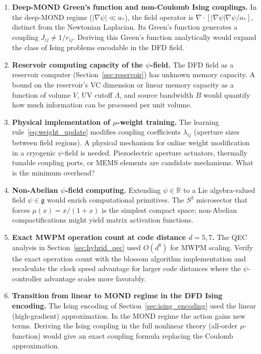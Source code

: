 \documentclass[11pt]{article}
\theoremstyle{definition}
\theoremstyle{remark}
\begin{document}
\begin{enumerate}

\item \textbf{Deep-MOND Green's function and non-Coulomb Ising couplings.}
In the deep-MOND regime ($|\nabla\psi| \ll a_*$), the field operator
is $\nabla\cdot[|\nabla\psi|\nabla\psi/a_*]$, distinct from the
Newtonian Laplacian. Its Green's function generates a coupling
$J_{ij} \neq 1/r_{ij}$. Deriving this Green's function analytically
would expand the class of Ising problems encodable in the DFD field.

\item \textbf{Reservoir computing capacity of the $\psi$-field.}
The DFD field as a reservoir computer (Section~\ref{sec:reservoir})
has unknown memory capacity. A bound on the reservoir's VC dimension
or linear memory capacity as a function of volume $V$, UV cutoff
$\Lambda$, and source bandwidth $B$ would quantify how much information
can be processed per unit volume.

\item \textbf{Physical implementation of $\mu$-weight training.}
The learning rule~\eqref{eq:weight_update} modifies coupling
coefficients $\lambda_{ij}$ (aperture sizes between field regions).
A physical mechanism for online weight modification in a cryogenic
$\psi$-field is needed. Piezoelectric aperture actuators, thermally
tunable coupling ports, or MEMS elements are candidate mechanisms.
What is the minimum overhead?

\item \textbf{Non-Abelian $\psi$-field computing.}
Extending $\psi \in \mathbb{R}$ to a Lie algebra-valued field
$\psi \in \mathfrak{g}$ would enrich computational primitives. The
$S^3$ microsector that forces $\mu(x) = x/(1+x)$ is the simplest
compact space; non-Abelian compactifications might yield matrix
activation functions.

\item \textbf{Exact MWPM operation count at code distance $d = 5, 7$.}
The QEC analysis in Section~\ref{sec:hybrid_qec} used $O(d^6)$ for
MWPM scaling. Verify the exact operation count with the blossom
algorithm implementation and recalculate the clock speed advantage for
larger code distances where the $\psi$-controller advantage scales more
favorably.

\item \textbf{Transition from linear to MOND regime in the DFD
Ising encoding.}
The Ising encoding of Section~\ref{sec:ising_encoding} used the
linear (high-gradient) approximation. In the MOND regime the action
gains new terms. Deriving the Ising coupling in the full nonlinear
theory (all-order $\mu$-function) would give an exact coupling formula
replacing the Coulomb approximation.

\end{enumerate}
\end{document}
